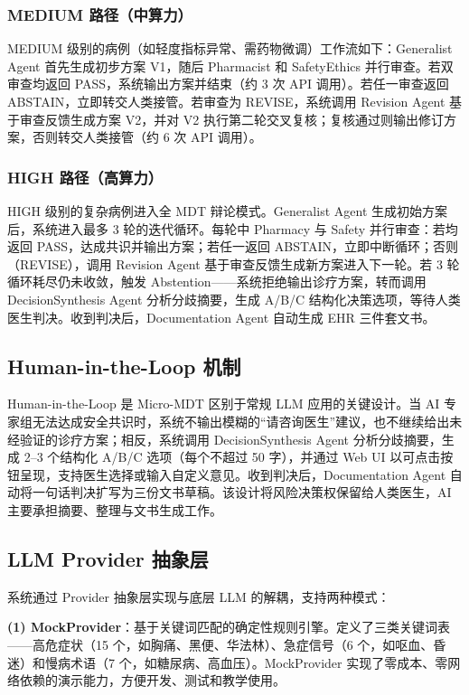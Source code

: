 \documentclass[11pt,a4paper]{ctexart}
\begin{document}
\subsubsection{MEDIUM 路径（中算力）}

MEDIUM 级别的病例（如轻度指标异常、需药物微调）工作流如下：Generalist Agent 首先生成初步方案 V1，随后 Pharmacist 和 SafetyEthics 并行审查。若双审查均返回 PASS，系统输出方案并结束（约 3 次 API 调用）。若任一审查返回 ABSTAIN，立即转交人类接管。若审查为 REVISE，系统调用 Revision Agent 基于审查反馈生成方案 V2，并对 V2 执行第二轮交叉复核；复核通过则输出修订方案，否则转交人类接管（约 6 次 API 调用）。

\subsubsection{HIGH 路径（高算力）}

HIGH 级别的复杂病例进入全 MDT 辩论模式。Generalist Agent 生成初始方案后，系统进入最多 3 轮的迭代循环。每轮中 Pharmacy 与 Safety 并行审查：若均返回 PASS，达成共识并输出方案；若任一返回 ABSTAIN，立即中断循环；否则（REVISE），调用 Revision Agent 基于审查反馈生成新方案进入下一轮。若 3 轮循环耗尽仍未收敛，触发 Abstention——系统拒绝输出诊疗方案，转而调用 DecisionSynthesis Agent 分析分歧摘要，生成 A/B/C 结构化决策选项，等待人类医生判决。收到判决后，Documentation Agent 自动生成 EHR 三件套文书。

\subsection{Human-in-the-Loop 机制}

Human-in-the-Loop 是 Micro-MDT 区别于常规 LLM 应用的关键设计。当 AI 专家组无法达成安全共识时，系统不输出模糊的``请咨询医生''建议，也不继续给出未经验证的诊疗方案；相反，系统调用 DecisionSynthesis Agent 分析分歧摘要，生成 2--3 个结构化 A/B/C 选项（每个不超过 50 字），并通过 Web UI 以可点击按钮呈现，支持医生选择或输入自定义意见。收到判决后，Documentation Agent 自动将一句话判决扩写为三份文书草稿。该设计将风险决策权保留给人类医生，AI 主要承担摘要、整理与文书生成工作。

\subsection{LLM Provider 抽象层}

系统通过 Provider 抽象层实现与底层 LLM 的解耦，支持两种模式：

\textbf{(1) MockProvider}：基于关键词匹配的确定性规则引擎。定义了三类关键词表——高危症状（15 个，如胸痛、黑便、华法林）、急症信号（6 个，如呕血、昏迷）和慢病术语（7 个，如糖尿病、高血压）。MockProvider 实现了零成本、零网络依赖的演示能力，方便开发、测试和教学使用。
\end{document}

